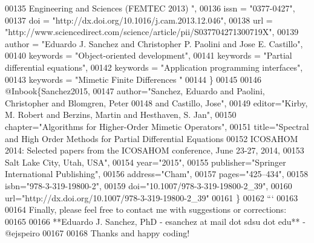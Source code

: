 \begin{DoxyCode}
00135 Engineering and Sciences (FEMTEC 2013) ",
00136   issn = "0377-0427",
00137   doi = "http://dx.doi.org/10.1016/j.cam.2013.12.046",
00138   url = "http://www.sciencedirect.com/science/article/pii/S037704271300719X",
00139   author = "Eduardo J. Sanchez and Christopher P. Paolini and Jose E. Castillo",
00140   keywords = "Object-oriented development",
00141   keywords = "Partial differential equations",
00142   keywords = "Application programming interfaces",
00143   keywords = "Mimetic Finite Differences "
00144 \}
00145 
00146 @Inbook\{Sanchez2015,
00147   author="Sanchez, Eduardo and Paolini, Christopher and Blomgren, Peter
00148 and Castillo, Jose",
00149   editor="Kirby, M. Robert and Berzins, Martin and Hesthaven, S. Jan",
00150   chapter="Algorithms for Higher-Order Mimetic Operators",
00151   title="Spectral and High Order Methods for Partial Differential Equations
00152 ICOSAHOM 2014: Selected papers from the ICOSAHOM conference, June 23-27, 2014,
00153 Salt Lake City, Utah, USA",
00154   year="2015",
00155   publisher="Springer International Publishing",
00156   address="Cham",
00157   pages="425--434",
00158   isbn="978-3-319-19800-2",
00159   doi="10.1007/978-3-319-19800-2\_39",
00160   url="http://dx.doi.org/10.1007/978-3-319-19800-2\_39"
00161 \}
00162 ```
00163 
00164 Finally, please feel free to contact me with suggestions or corrections:
00165 
00166 **Eduardo J. Sanchez, PhD - esanchez at mail dot sdsu dot edu** - @ejspeiro
00167 
00168 Thanks and happy coding!
\end{DoxyCode}
